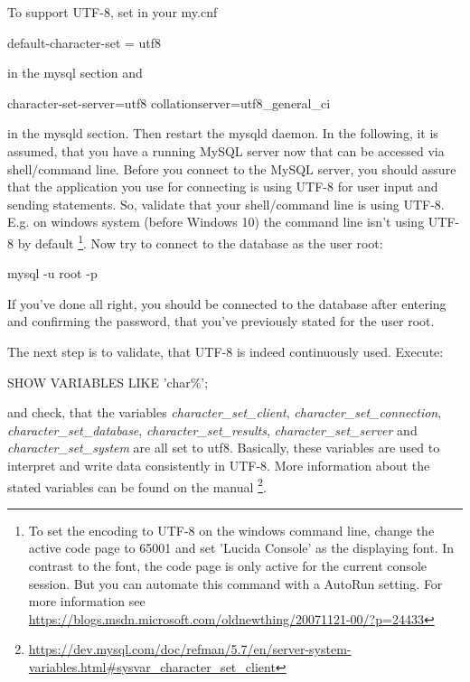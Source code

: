To support UTF-8, set in your my.cnf 

\begin{codebox}
	default-character-set = utf8
\end{codebox}

in the mysql section and

\begin{codebox}
	character-set-server=utf8\newline
	collation\-server=utf8\_general\_ci
\end{codebox}

in the mysqld section. Then restart the mysqld daemon. In the following, it is assumed, that you have a running MySQL server now that can be accessed via shell/command line. Before you connect to the MySQL server, you should assure that the application you use for connecting is using UTF-8 for user input and sending statements. So, validate that your shell/command line is using UTF-8. E.g. on windows system (before Windows 10) the command line isn't using UTF-8 by default
\footnote{To set the encoding to UTF-8 on the windows command line, change the active code page to 65001 and set 'Lucida Console' as the displaying font. In contrast to the font, the code page is only active for the current console session. But you can automate this command with a AutoRun setting. For more information see \url{https://blogs.msdn.microsoft.com/oldnewthing/20071121-00/?p=24433}}.  
Now try to connect to the database as the user root:

\begin{codebox}
	mysql -u root -p 
\end{codebox}

If you've done all right, you should be connected to the database after entering and confirming the password, that you've previously stated for the user root.

The next step is to validate, that UTF-8 is indeed continuously used. Execute:

\begin{codebox}
	SHOW VARIABLES LIKE 'char\%';
\end{codebox}

and check, that the variables \emph{character\_set\_client}, \emph{character\_set\_connection}, \emph{character\_set\_database}, \emph{character\_set\_results}, \emph{character\_set\_server} and \emph{character\_set\_system} are all set to utf8.
Basically, these variables are used to interpret and write data consistently in UTF-8. More information about the stated variables can be found on the manual
\footnote{\url{https://dev.mysql.com/doc/refman/5.7/en/server-system-variables.html\#sysvar_character_set_client}}.

